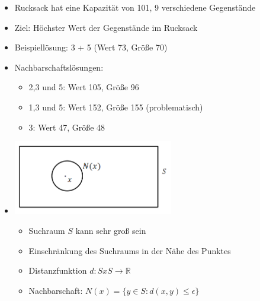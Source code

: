\documentclass[
    12pt,
    a4paper,
    ngerman,
    color=3b,%
    marginpar=false,
    colorback=false,
    leqno,
]{tudaexercise}
\begin{document}
\begin{itemize}
\begin{itemize}
                \item Rucksack hat eine Kapazität von 101, 9 verschiedene Gegenstände
                \item Ziel: Höchster Wert der Gegenstände im Rucksack
                \item Beispiellösung: 3 + 5 (Wert 73, Größe 70)
                \item Nachbarschaftslösungen: 
                    \begin{itemize}
                        \item 2,3 und 5: Wert 105, Größe 96
                        \item 1,3 und 5: Wert 152, Größe 155 (problematisch)
                        \item 3: Wert 47, Größe 48
                    \end{itemize}
                \item[]
                    \begin{minipage}{0.4\textwidth}
                        \includegraphics[width=7cm]{pictures/nachbarschaft.PNG}
                    \end{minipage}
                    \begin{minipage}{0.5\textwidth}
                        \begin{itemize}
                            \item Suchraum $S$ kann sehr groß sein
                            \item Einschränkung des Suchraums in der Nähe des Punktes
                            \item Distanzfunktion $d: S x S \rightarrow \mathbb{R}$
                            \item Nachbarschaft: $N(x) = \{y \in S: d(x,y) \leq \epsilon\}$
                        \end{itemize}
                    \end{minipage}
            \end{itemize}


\end{itemize}
\end{document}
